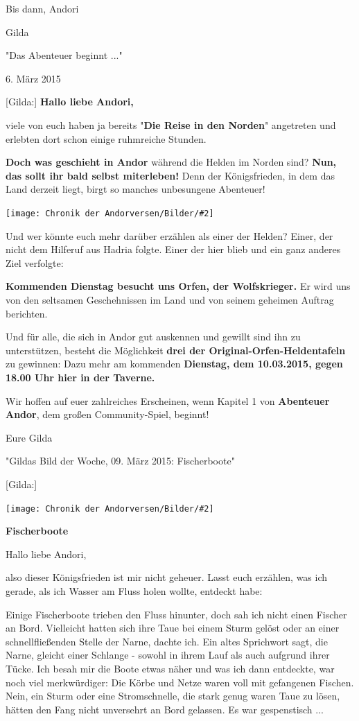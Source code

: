 \documentclass[10pt, a4paper, oneside]{book}
\newcommand{\bildmitts}[2][height=0.32\textwidth,width=0.48\textwidth,keepaspectratio]{%
    \begin{center}
        \texttt{[image: Chronik der Andorversen/Bilder/\#2]}
    \end{center}
}
\begin{document}
\begin{multicols}{2}
Bis dann, Andori

Gilda

\begin{center}
    "Das Abenteuer beginnt ..."

    6. März 2015
\end{center}

[Gilda:] \textbf{Hallo liebe Andori,}

viele von euch haben ja bereits "\textbf{Die Reise in den Norden}" angetreten und erlebten dort schon einige ruhmreiche Stunden.

\textbf{Doch was geschieht in Andor} während die Helden im Norden sind? \textbf{Nun, das sollt ihr bald selbst miterleben!} Denn der Königsfrieden, in dem das Land derzeit liegt, birgt so manches unbesungene Abenteuer!

\bildmitts{AA2015 Das Abenteuer beginnt 1.jpeg}

Und wer könnte euch mehr darüber erzählen als einer der Helden? Einer, der nicht dem Hilferuf aus Hadria folgte. Einer der hier blieb und ein ganz anderes Ziel verfolgte:

\textbf{Kommenden Dienstag besucht uns Orfen, der Wolfskrieger.} Er wird uns von den seltsamen Geschehnissen im Land und von seinem geheimen Auftrag berichten.

Und für alle, die sich in Andor gut auskennen und gewillt sind ihn zu unterstützen, besteht die Möglichkeit \textbf{drei der Original-Orfen-Heldentafeln} zu gewinnen: Dazu mehr am kommenden \textbf{Dienstag, dem 10.03.2015, gegen 18.00 Uhr hier in der Taverne.}

Wir hoffen auf euer zahlreiches Erscheinen, wenn Kapitel 1 von \textbf{Abenteuer Andor}, dem großen Community-Spiel, beginnt!

Eure Gilda

\begin{center}
    "Gildas Bild der Woche, 09. März 2015: Fischerboote"
\end{center}

[Gilda:]

\bildmitts{AA2015 Fischerboote 1.jpeg}

\textbf{Fischerboote}

Hallo liebe Andori,

also dieser Königsfrieden ist mir nicht geheuer. Lasst euch erzählen, was ich gerade, als ich Wasser am Fluss holen wollte, entdeckt habe:

Einige Fischerboote trieben den Fluss hinunter, doch sah ich nicht einen Fischer an Bord. Vielleicht hatten sich ihre Taue bei einem Sturm gelöst oder an einer schnellfließenden Stelle der Narne, dachte ich. Ein altes Sprichwort sagt, die Narne, gleicht einer Schlange - sowohl in ihrem Lauf als auch aufgrund ihrer Tücke.
Ich besah mir die Boote etwas näher und was ich dann entdeckte, war noch viel merkwürdiger: Die Körbe und Netze waren voll mit gefangenen Fischen. Nein, ein Sturm oder eine Stromschnelle, die stark genug waren Taue zu lösen, hätten den Fang nicht unversehrt an Bord gelassen. Es war gespenstisch ...


\end{multicols}
\end{document}
